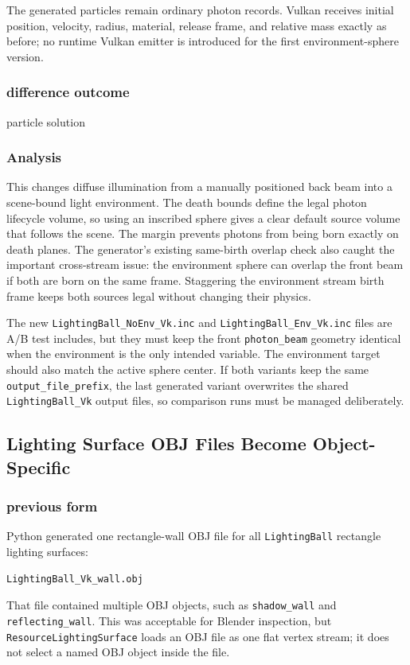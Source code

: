The generated particles remain ordinary photon records.  Vulkan receives
initial position, velocity, radius, material, release frame, and relative
mass exactly as before; no runtime Vulkan emitter is introduced for the first
environment-sphere version.

\subsubsection{difference outcome}

particle solution

\subsubsection{Analysis}

This changes diffuse illumination from a manually positioned back beam into a
scene-bound light environment.  The death bounds define the legal photon
lifecycle volume, so using an inscribed sphere gives a clear default source
volume that follows the scene.  The margin prevents photons from being born
exactly on death planes.  The generator's existing same-birth overlap check
also caught the important cross-stream issue: the environment sphere can
overlap the front beam if both are born on the same frame.  Staggering the
environment stream birth frame keeps both sources legal without changing
their physics.

The new \texttt{LightingBall\_NoEnv\_Vk.inc} and
\texttt{LightingBall\_Env\_Vk.inc} files are A/B test includes, but they must
keep the front \texttt{photon\_beam} geometry identical when the environment
is the only intended variable.  The environment target should also match the
active sphere center.  If both variants keep the same
\texttt{output\_file\_prefix}, the last generated variant overwrites the
shared \texttt{LightingBall\_Vk} output files, so comparison runs must be
managed deliberately.

\subsection{Lighting Surface OBJ Files Become Object-Specific}

\subsubsection{previous form}

Python generated one rectangle-wall OBJ file for all
\texttt{LightingBall} rectangle lighting surfaces:
\begin{verbatim}
LightingBall_Vk_wall.obj
\end{verbatim}
That file contained multiple OBJ objects, such as \texttt{shadow\_wall} and
\texttt{reflecting\_wall}.  This was acceptable for Blender inspection, but
\texttt{ResourceLightingSurface} loads an OBJ file as one flat vertex stream;
it does not select a named OBJ object inside the file.

